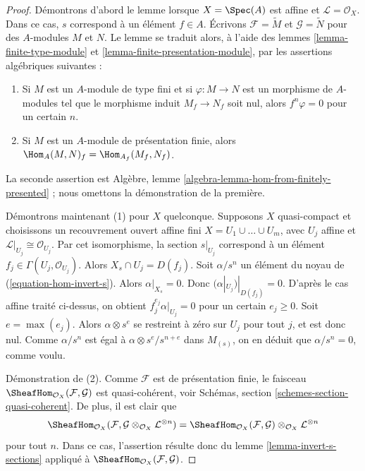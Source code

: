 \begin{proof}
Démontrons d'abord le lemme lorsque $X = \Spec(A)$ est affine
et $\mathcal{L} = \mathcal{O}_X$. Dans ce cas, $s$ correspond
à un élément $f \in A$. Écrivons
$\mathcal{F} = \widetilde{M}$ et $\mathcal{G} = \widetilde{N}$
pour des $A$-modules $M$ et $N$. Le lemme se traduit alors, à
l'aide des lemmes \ref{lemma-finite-type-module} et
\ref{lemma-finite-presentation-module}, par
les assertions algébriques suivantes :
\begin{enumerate}
\item Si $M$ est un $A$-module de type fini et si $\varphi : M \to N$ est un
morphisme de $A$-modules tel que le morphisme induit $M_f \to N_f$ soit nul,
alors $f^n\varphi = 0$ pour un certain $n$.
\item Si $M$ est un $A$-module de présentation finie, alors
$\Hom_A(M, N)_f = \Hom_{A_f}(M_f, N_f)$.
\end{enumerate}
La seconde assertion est
Algèbre, lemme \ref{algebra-lemma-hom-from-finitely-presented} ; nous
omettons la démonstration de la première.

\medskip\noindent
Démontrons maintenant (1) pour $X$ quelconque.
Supposons $X$ quasi-compact et choisissons un recouvrement ouvert affine fini
$X = U_1 \cup \ldots \cup U_m$, avec $U_j$ affine et
$\mathcal{L}|_{U_j} \cong \mathcal{O}_{U_j}$. Par cet isomorphisme,
la section $s|_{U_j}$ correspond à un élément
$f_j \in \Gamma(U_j, \mathcal{O}_{U_j})$. Alors
$X_s \cap U_j = D(f_j)$.
Soit $\alpha/s^n$ un élément du noyau de
(\ref{equation-hom-invert-s}). Alors $\alpha|_{X_s} = 0$.
Donc $(\alpha|_{U_j})|_{D(f_j)} = 0$. D'après le cas affine traité
ci-dessus, on obtient $f_j^{e_j} \alpha|_{U_j} = 0$ pour un certain
$e_j \geq 0$. Soit $e = \max(e_j)$. Alors $\alpha \otimes s^e$
se restreint à zéro sur $U_j$ pour tout $j$, et est donc nul. Comme $\alpha/s^n$
est égal à $\alpha \otimes s^e/s^{n + e}$ dans $M_{(s)}$, on en déduit que
$\alpha/s^n = 0$, comme voulu.

\medskip\noindent
Démonstration de (2). Comme $\mathcal{F}$ est de présentation finie, le
faisceau $\SheafHom_{\mathcal{O}_X}(\mathcal{F}, \mathcal{G})$ est
quasi-cohérent, voir Schémas, section \ref{schemes-section-quasi-coherent}.
De plus, il est clair que
$$
\SheafHom_{\mathcal{O}_X}(\mathcal{F},
\mathcal{G} \otimes_{\mathcal{O}_X} \mathcal{L}^{\otimes n}) =
\SheafHom_{\mathcal{O}_X}(\mathcal{F}, \mathcal{G})
\otimes_{\mathcal{O}_X} \mathcal{L}^{\otimes n}
$$
pour tout $n$. Dans ce cas, l'assertion résulte donc du
lemme \ref{lemma-invert-s-sections} appliqué à
$\SheafHom_{\mathcal{O}_X}(\mathcal{F}, \mathcal{G})$.
\end{proof}





